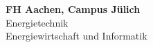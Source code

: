 
\begin{titlepage}
    
    \centering
    \begin{minipage}[t]{20cm}
        \vspace{0.25cm}
        \hspace{0cm}
        \begin{minipage}[t]{15cm}
            \centering
            \textbf{\large FH Aachen, Campus Jülich}\\
            \large Energietechnik\\
            \large Energiewirtschaft und Informatik
        \end{minipage}
        \hspace{0.5cm}
        \begin{minipage}[t]{0cm}
            \vspace{0pt}

\end{minipage}
\end{minipage}
\end{titlepage}
